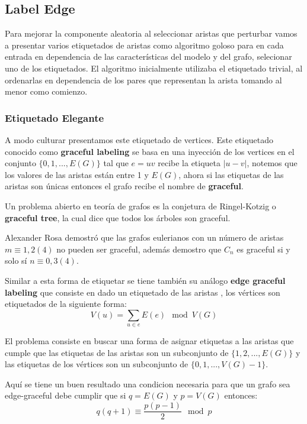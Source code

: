 \documentclass[a4paper]{article}
\begin{document}
\subsection{Label Edge}

Para mejorar la componente aleatoria al seleccionar aristas que perturbar vamos a presentar varios etiquetados de aristas como algoritmo goloso para en cada entrada en dependencia de las caracter\'isticas del modelo y del grafo, selecionar uno de los etiquetados. El algoritmo inicialmente utilizaba el etiquetado trivial, al ordenarlas en dependencia de los pares que representan la arista tomando al menor como comienzo.

\subsubsection{Etiquetado Elegante}

A modo culturar presentamos este etiquetado de vertices. Este etiquetado conocido como \textbf{graceful labeling} se basa en una inyecci\'on de los vertices en el conjunto $\{0, 1, ..., E(G)\}$ tal que $e=uv$ recibe la etiqueta $|u - v|$, notemos que los valores de las aristas est\'an entre 1 y $E(G)$, ahora si las etiquetas de las aristas son \'unicas entonces el grafo recibe el nombre de \textbf{graceful}.

Un problema abierto en teor\'ia de grafos es la conjetura de Ringel-Kotzig o  \textbf{graceful tree}, la cual dice que todos los \'arboles son graceful.

Alexander Rosa demostr\'o que las grafos eulerianos con un n\'umero de aristas $m \equiv 1, 2 (4)$ no pueden ser graceful, adem\'as demostro que $C_n$ es graceful si y solo s\'i $n \equiv 0,3 (4)$.

Similar a esta forma de etiquetar se tiene tambi\'en su an\'alogo \textbf{edge graceful labeling} que consiste en dado un etiquetado de las aristas , los v\'ertices son etiquetados de la siguiente forma:
$$ V(u) = \sum_{u \in e} E(e) \mod V(G)$$

El problema consiste en buscar una forma de asignar etiquetas a las aristas que cumple que las etiquetas de las aristas son un subconjunto de $\{1,2, ..., E(G)\}$ y las etiquetas de los v\'ertices son un subconjunto de $\{0, 1, ..., V(G)-1\}$.

Aqu\'i se tiene un buen resultado una condicion necesaria para que un grafo sea edge-graceful debe cumplir que si $q = E(G)$ y $p = V(G)$ entonces:
$$q(q+1) \equiv \frac{p(p-1)}{2} \mod p$$
\end{document}
